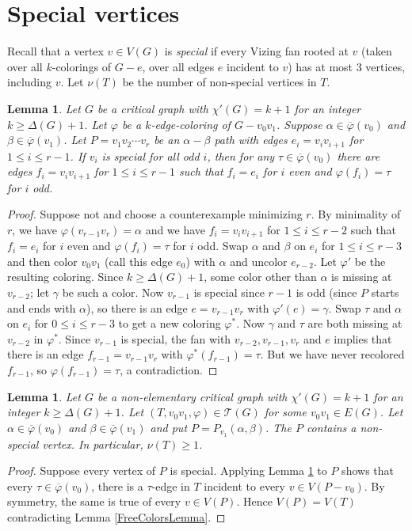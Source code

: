 \documentclass[12pt]{amsart}
\theoremstyle{plain}
\newtheorem{lem}[thm]{Lemma}
\theoremstyle{definition}
\theoremstyle{remark}
\newcommand{\fancy}[1]{\mathcal{#1}}
\newcommand{\T}{\fancy{T}}
\newcommand{\vph}{\varphi}
\newcommand{\vphn}{\overline{\varphi}}
\begin{document}
\section{Special vertices}
Recall that a vertex $v \in V(G)$ is \emph{special} if every Vizing fan rooted
at $v$ (taken over all $k$-colorings of $G-e$, over all edges $e$ incident to
$v$) has at most 3 vertices, including $v$.
Let $\nu(T)$ be the number of non-special vertices in $T$.
\begin{lem}\label{SpecialPath}
Let $G$ be a critical graph with $\chi'(G) = k+1$ for an integer $k \ge \Delta(G) + 1$.
Let $\vph$ be a $k$-edge-coloring of $G-v_0v_1$.  Suppose $\alpha \in \vphn(v_0)$ and $\beta \in \vphn(v_1)$.  
Let $P = v_1v_2\cdots v_r$ be an $\alpha-\beta$ path
with edges $e_i = v_iv_{i+1}$ for $1 \le i \le r-1$.  If $v_i$ is special for
all odd $i$, then for any $\tau \in \vphn(v_0)$ there are edges $f_i =
v_iv_{i+1}$ for $1 \le i \le r-1$ such that $f_i = e_i$ for $i$ even and
$\vph(f_i) = \tau$ for $i$ odd.
\end{lem}
\begin{proof}
Suppose not and choose a counterexample minimizing $r$.  By minimality of
$r$, we have $\vph(v_{r-1}v_r) = \alpha$ and we have $f_i = v_iv_{i+1}$ for
$1 \le i \le r-2$ such that $f_i = e_i$ for $i$ even and $\vph(f_i) = \tau$ for
$i$ odd.  Swap $\alpha$ and $\beta$ on $e_i$ for $1 \le i \le r-3$ and then
color $v_0v_1$ (call this edge $e_0$) with $\alpha$ and uncolor $e_{r-2}$.  Let
$\vph'$ be the resulting coloring.  Since $k \ge \Delta(G) + 1$, some color
other than $\alpha$ is missing at $v_{r-2}$; let $\gamma$ be such a color.  Now 
$v_{r-1}$ is special since $r-1$ is odd (since $P$ starts and ends with
$\alpha$), so there is an edge $e = v_{r-1}v_r$ with $\vph'(e) = \gamma$.  
Swap $\tau$ and $\alpha$ on $e_i$ for $0 \le i \le r-3$ to get a new coloring
$\vph^*$.  Now $\gamma$ and $\tau$ are both missing at $v_{r-2}$ in $\vph^*$.
Since $v_{r-1}$ is special, the fan with $v_{r-2}, v_{r-1}, v_r$ and $e$
implies that there is an edge $f_{r-1} = v_{r-1}v_r$ with $\vph^*(f_{r-1}) =
\tau$.  But we have never recolored $f_{r-1}$, so $\vph(f_{r-1})=\tau$, a
contradiction.
\end{proof}

\begin{lem}\label{ZeroNonSpecial}
Let $G$ be a non-elementary critical graph with $\chi'(G) = k+1$ for an integer $k \ge \Delta(G) + 1$.
Let $(T, v_0v_1, \vph) \in \T(G)$ for some $v_0v_1 \in E(G)$.  Let $\alpha \in \vphn(v_0)$ and $\beta \in \vphn(v_1)$ and put $P = P_{v_1}(\alpha, \beta)$.  The $P$ contains a non-special vertex. 
In particular, $\nu(T) \ge 1$.
\label{lem2}
\end{lem}
\begin{proof}
Suppose every vertex of $P$ is special.  Applying Lemma \ref{SpecialPath} to $P$ shows that every $\tau \in \vphn(v_0)$, 
there is a $\tau$-edge in $T$ incident to every $v \in V(P - v_0)$. By symmetry, the same is true of every $v \in V(P)$.  Hence $V(P) = V(T)$ contradicting Lemma \ref{FreeColorsLemma}.
\end{proof}
\end{document}
